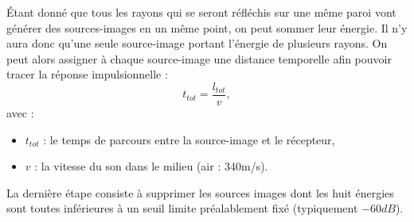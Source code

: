 %
Étant donné que tous les rayons qui se seront réfléchis sur une même paroi vont générer des sources-images en un même point, on peut sommer leur énergie. Il n'y aura donc qu'une seule source-image portant l'énergie de plusieurs rayons. On peut alors assigner à chaque source-image une distance temporelle afin pouvoir tracer la réponse impulsionnelle :
\begin{equation}
 t_{tot} =  \frac{l_{tot}}{v},
\end{equation}
avec : 
\begin{itemize}
\item$ t_{tot}$ : le temps de parcours entre la source-image et le récepteur,
\item$v$ : la vitesse du son dans le milieu (air : 340m/s).
\end{itemize}
La dernière étape consiste à supprimer les sources images dont les huit énergies sont toutes inférieures à un seuil limite préalablement fixé (typiquement $-60dB$).
%
